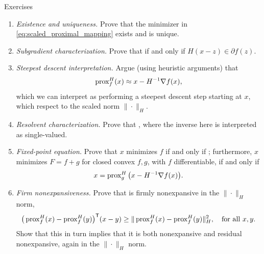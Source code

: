 \begin{xcb}{Exercises}
\begin{enumerate}[label=\thechapter.\arabic*]
\begin{enumerate}[label=\alph*.]
\item \emph{Existence and uniqueness.} Prove that the minimizer in
  \eqref{eq:scaled_proximal_mapping} exists and is unique.

\item \emph{Subgradient characterization.} Prove that 
  if and only if $H(x - z) \in \partial f(z)$. 

\item \emph{Steepest descent interpretation.} Argue (using heuristic arguments)
  that 
  \[
  \operatorname{prox}_f^H(x) \approx x - H^{-1} \nabla f(x),
  \] 
  which we can interpret as performing a steepest descent step starting at $x$,
  which respect to the scaled norm $\|\cdot\|_H$. 

\item \emph{Resolvent characterization.} Prove that , where the inverse here is interpreted as
  single-valued.   

\item \emph{Fixed-point equation.} Prove that $x$ minimizes $f$ if and only if
  ; furthermore, $x$ minimizes $F = f+g$ for closed
  convex $f,g$, with $f$ differentiable, if and only if    
  \[
  x = \operatorname{prox}_g^H \big( x - H^{-1} \nabla f(x) \big).
  \]

\item \emph{Firm nonexpansiveness.} Prove that  is firmly
  nonexpansive in the $\|\cdot\|_H$ norm, 
  \[
  \big( \operatorname{prox}_f^H(x) - \operatorname{prox}_f^H(y) \big)^{\mathsf{T}} (x - y) \geq 
  \| \operatorname{prox}_f^H(x) - \operatorname{prox}_f^H(y) \|_H^2, \quad \text{for all $x,y$}.   
  \]
  Show that this in turn implies that it is both nonexpansive and residual
  nonexpansive, again in the $\|\cdot\|_H$ norm.
\end{enumerate}
\end{enumerate}
\end{xcb}